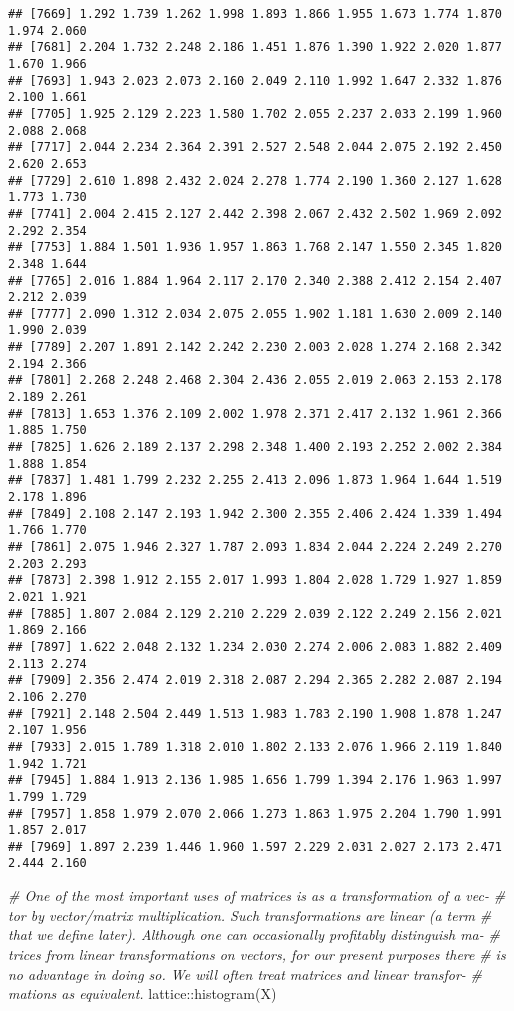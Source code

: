 \documentclass[
]{article}
\newenvironment{Shaded}{\begin{snugshade}}{\end{snugshade}}
\newcommand{\CommentTok}[1]{\textcolor[rgb]{0.56,0.35,0.01}{\textit{#1}}}
\newcommand{\FunctionTok}[1]{\textcolor[rgb]{0.00,0.00,0.00}{#1}}
\newcommand{\NormalTok}[1]{#1}
\newcommand{\SpecialCharTok}[1]{\textcolor[rgb]{0.00,0.00,0.00}{#1}}
\begin{document}
\begin{verbatim}
## [7669] 1.292 1.739 1.262 1.998 1.893 1.866 1.955 1.673 1.774 1.870 1.974 2.060
## [7681] 2.204 1.732 2.248 2.186 1.451 1.876 1.390 1.922 2.020 1.877 1.670 1.966
## [7693] 1.943 2.023 2.073 2.160 2.049 2.110 1.992 1.647 2.332 1.876 2.100 1.661
## [7705] 1.925 2.129 2.223 1.580 1.702 2.055 2.237 2.033 2.199 1.960 2.088 2.068
## [7717] 2.044 2.234 2.364 2.391 2.527 2.548 2.044 2.075 2.192 2.450 2.620 2.653
## [7729] 2.610 1.898 2.432 2.024 2.278 1.774 2.190 1.360 2.127 1.628 1.773 1.730
## [7741] 2.004 2.415 2.127 2.442 2.398 2.067 2.432 2.502 1.969 2.092 2.292 2.354
## [7753] 1.884 1.501 1.936 1.957 1.863 1.768 2.147 1.550 2.345 1.820 2.348 1.644
## [7765] 2.016 1.884 1.964 2.117 2.170 2.340 2.388 2.412 2.154 2.407 2.212 2.039
## [7777] 2.090 1.312 2.034 2.075 2.055 1.902 1.181 1.630 2.009 2.140 1.990 2.039
## [7789] 2.207 1.891 2.142 2.242 2.230 2.003 2.028 1.274 2.168 2.342 2.194 2.366
## [7801] 2.268 2.248 2.468 2.304 2.436 2.055 2.019 2.063 2.153 2.178 2.189 2.261
## [7813] 1.653 1.376 2.109 2.002 1.978 2.371 2.417 2.132 1.961 2.366 1.885 1.750
## [7825] 1.626 2.189 2.137 2.298 2.348 1.400 2.193 2.252 2.002 2.384 1.888 1.854
## [7837] 1.481 1.799 2.232 2.255 2.413 2.096 1.873 1.964 1.644 1.519 2.178 1.896
## [7849] 2.108 2.147 2.193 1.942 2.300 2.355 2.406 2.424 1.339 1.494 1.766 1.770
## [7861] 2.075 1.946 2.327 1.787 2.093 1.834 2.044 2.224 2.249 2.270 2.203 2.293
## [7873] 2.398 1.912 2.155 2.017 1.993 1.804 2.028 1.729 1.927 1.859 2.021 1.921
## [7885] 1.807 2.084 2.129 2.210 2.229 2.039 2.122 2.249 2.156 2.021 1.869 2.166
## [7897] 1.622 2.048 2.132 1.234 2.030 2.274 2.006 2.083 1.882 2.409 2.113 2.274
## [7909] 2.356 2.474 2.019 2.318 2.087 2.294 2.365 2.282 2.087 2.194 2.106 2.270
## [7921] 2.148 2.504 2.449 1.513 1.983 1.783 2.190 1.908 1.878 1.247 2.107 1.956
## [7933] 2.015 1.789 1.318 2.010 1.802 2.133 2.076 1.966 2.119 1.840 1.942 1.721
## [7945] 1.884 1.913 2.136 1.985 1.656 1.799 1.394 2.176 1.963 1.997 1.799 1.729
## [7957] 1.858 1.979 2.070 2.066 1.273 1.863 1.975 2.204 1.790 1.991 1.857 2.017
## [7969] 1.897 2.239 1.446 1.960 1.597 2.229 2.031 2.027 2.173 2.471 2.444 2.160
\end{verbatim}

\begin{Shaded}
\begin{Highlighting}[]
\CommentTok{\# One of the most important uses of matrices is as a transformation of a vec{-}}
\CommentTok{\# tor by vector/matrix multiplication. Such transformations are linear (a term}
\CommentTok{\# that we deﬁne later). Although one can occasionally proﬁtably distinguish ma{-}}
\CommentTok{\# trices from linear transformations on vectors, for our present purposes there}
\CommentTok{\# is no advantage in doing so. We will often treat matrices and linear transfor{-}}
\CommentTok{\# mations as equivalent.}
\NormalTok{lattice}\SpecialCharTok{::}\FunctionTok{histogram}\NormalTok{(X)}
\end{Highlighting}
\end{Shaded}
\end{document}
